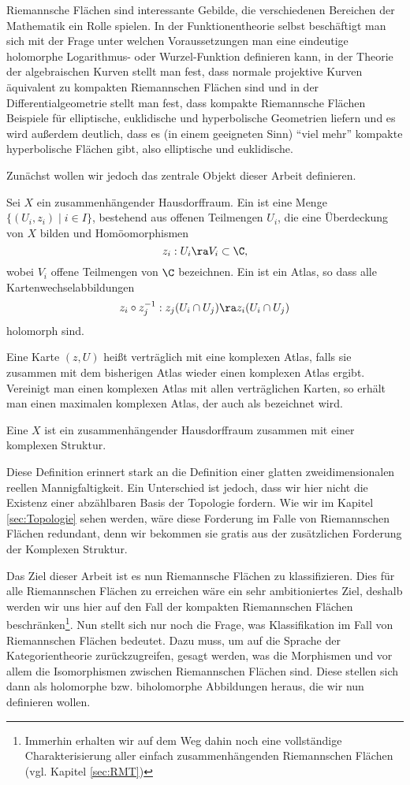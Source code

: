 Riemannsche Flächen sind interessante Gebilde, die verschiedenen
Bereichen der Mathematik ein Rolle spielen. In der Funktionentheorie
selbst beschäftigt man sich mit der Frage unter welchen
Voraussetzungen man eine eindeutige holomorphe Logarithmus- oder
Wurzel-Funktion definieren kann, in der Theorie der algebraischen
Kurven stellt man fest, dass normale projektive Kurven äquivalent zu
kompakten Riemannschen Flächen sind und in der Differentialgeometrie
stellt man fest, dass kompakte Riemannsche Flächen Beispiele für
elliptische, euklidische und hyperbolische Geometrien liefern und es
wird außerdem deutlich, dass es (in einem geeigneten Sinn) "`viel
mehr"' kompakte hyperbolische Flächen gibt, also elliptische und euklidische.

Zunächst wollen wir jedoch das zentrale Objekt dieser Arbeit
definieren.

\begin{defin}
  \label{def:rf}
  Sei $X$ ein zusammenhängender Hausdorffraum. Ein 
  ist eine Menge $\{(U_i, z_i) \mid i \in I\}$, bestehend aus
  offenen Teilmengen $U_i$, die eine Überdeckung von $X$ bilden und
  Homöomorphismen
  \[
  z_i: U_i \ra V_i \subset \C,
  \]
  wobei $V_i$ offene Teilmengen von $\C$ bezeichnen. Ein
   ist ein Atlas, so dass alle
  Kartenwechselabbildungen
  \[
  z_i \circ z_j^{-1} : z_j(U_i \cap U_j) \ra z_i(U_i \cap U_j)
  \]
  holomorph sind.

  Eine Karte $(z,U)$ heißt verträglich mit eine
  komplexen Atlas, falls sie zusammen mit dem bisherigen Atlas wieder
  einen komplexen Atlas ergibt. Vereinigt man einen komplexen Atlas mit allen
  verträglichen Karten, so erhält man einen maximalen komplexen
  Atlas, der auch als  bezeichnet wird.

  Eine  $X$ ist ein zusammenhängender
  Hausdorffraum zusammen mit einer komplexen Struktur.
\end{defin}

Diese Definition erinnert stark an die Definition einer glatten
zweidimensionalen reellen Mannigfaltigkeit. Ein Unterschied ist
jedoch, dass wir hier nicht die Existenz einer abzählbaren Basis der
Topologie fordern. Wie wir im Kapitel \ref{sec:Topologie}
sehen werden, wäre diese Forderung im Falle von Riemannschen Flächen
redundant, denn wir bekommen sie gratis aus der zusätzlichen Forderung
der Komplexen Struktur.

Das Ziel dieser Arbeit ist es nun Riemannsche Flächen zu
klassifizieren. Dies für alle Riemannschen Flächen zu erreichen wäre
ein sehr ambitioniertes Ziel, deshalb werden wir uns hier auf den Fall
der kompakten Riemannschen Flächen beschränken\footnote{Immerhin
  erhalten wir auf dem Weg dahin noch eine vollständige
  Charakterisierung aller einfach zusammenhängenden Riemannschen
  Flächen (vgl. Kapitel \ref{sec:RMT})}. Nun stellt sich nur noch die
Frage, was Klassifikation im Fall von Riemannschen Flächen
bedeutet. Dazu muss, um auf die Sprache der Kategorientheorie
zurückzugreifen, gesagt werden, was die Morphismen und vor allem die
Isomorphismen zwischen Riemannschen Flächen sind. Diese stellen sich
dann als holomorphe bzw. biholomorphe Abbildungen heraus, die wir nun
definieren wollen.

